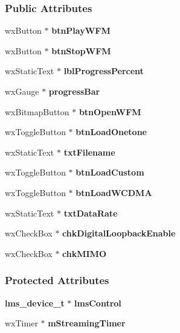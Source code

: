 \subsubsection*{Public Attributes}
\begin{DoxyCompactItemize}
\item 
wx\+Button $\ast$ {\bf btn\+Play\+W\+FM}
\item 
wx\+Button $\ast$ {\bf btn\+Stop\+W\+FM}
\item 
wx\+Static\+Text $\ast$ {\bf lbl\+Progress\+Percent}
\item 
wx\+Gauge $\ast$ {\bf progress\+Bar}
\item 
wx\+Bitmap\+Button $\ast$ {\bf btn\+Open\+W\+FM}
\item 
wx\+Toggle\+Button $\ast$ {\bf btn\+Load\+Onetone}
\item 
wx\+Static\+Text $\ast$ {\bf txt\+Filename}
\item 
wx\+Toggle\+Button $\ast$ {\bf btn\+Load\+Custom}
\item 
wx\+Toggle\+Button $\ast$ {\bf btn\+Load\+W\+C\+D\+MA}
\item 
wx\+Static\+Text $\ast$ {\bf txt\+Data\+Rate}
\item 
wx\+Check\+Box $\ast$ {\bf chk\+Digital\+Loopback\+Enable}
\item 
wx\+Check\+Box $\ast$ {\bf chk\+M\+I\+MO}
\end{DoxyCompactItemize}
\subsubsection*{Protected Attributes}
\begin{DoxyCompactItemize}
\item 
{\bf lms\+\_\+device\+\_\+t} $\ast$ {\bf lms\+Control}
\item 
wx\+Timer $\ast$ {\bf m\+Streaming\+Timer}
\end{DoxyCompactItemize}

